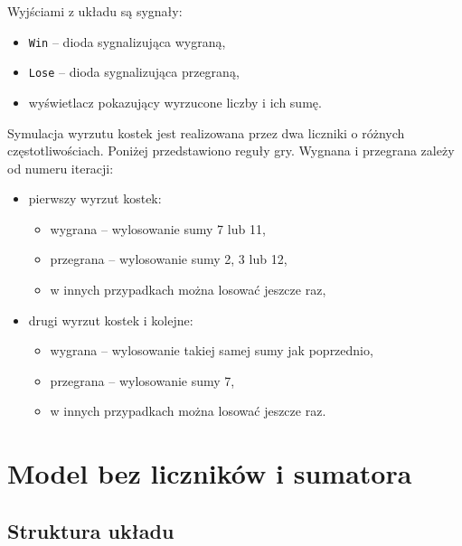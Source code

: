 \documentclass[a4paper,11pt,fleqn]{article}
\begin{document}
Wyjściami z układu są sygnały:
\begin{itemize}
\item \texttt{Win} -- dioda sygnalizująca wygraną,
\item \texttt{Lose} -- dioda sygnalizująca przegraną,
\item wyświetlacz pokazujący wyrzucone liczby i ich sumę.
\end{itemize}

Symulacja wyrzutu kostek jest realizowana przez dwa liczniki o różnych częstotliwościach. Poniżej przedstawiono reguły gry. Wygnana i przegrana zależy od numeru iteracji:
\begin{itemize}
\item pierwszy wyrzut kostek:
    \begin{itemize}
    \item wygrana -- wylosowanie sumy 7 lub 11, 
    \item przegrana -- wylosowanie sumy 2, 3 lub 12,
    \item w innych przypadkach można losować jeszcze raz,
    \end{itemize}
\item drugi wyrzut kostek i kolejne:
    \begin{itemize}
    \item wygrana -- wylosowanie takiej samej sumy jak poprzednio, 
    \item przegrana -- wylosowanie sumy 7,
    \item w innych przypadkach można losować jeszcze raz.
    \end{itemize}
\end{itemize}






\section{Model bez liczników i sumatora}

\subsection{Struktura układu}
\end{document}
